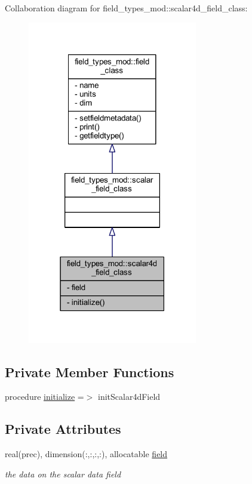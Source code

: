 Collaboration diagram for field\+\_\+types\+\_\+mod\+:\+:scalar4d\+\_\+field\+\_\+class\+:\nopagebreak
\begin{figure}[H]
\begin{center}
\leavevmode
\includegraphics[width=210pt]{structfield__types__mod_1_1scalar4d__field__class__coll__graph}
\end{center}
\end{figure}
\subsection*{Private Member Functions}
\begin{DoxyCompactItemize}
\item 
procedure \mbox{\hyperlink{structfield__types__mod_1_1scalar4d__field__class_ae2fc1ab22b67e883028f0b00395b3e82}{initialize}} =$>$ init\+Scalar4d\+Field
\end{DoxyCompactItemize}
\subsection*{Private Attributes}
\begin{DoxyCompactItemize}
\item 
real(prec), dimension(\+:,\+:,\+:,\+:), allocatable \mbox{\hyperlink{structfield__types__mod_1_1scalar4d__field__class_abb02055e1e69f0d70d67378b8c31ce85}{field}}
\begin{DoxyCompactList}\small\item\em the data on the scalar data field \end{DoxyCompactList}\end{DoxyCompactItemize}



